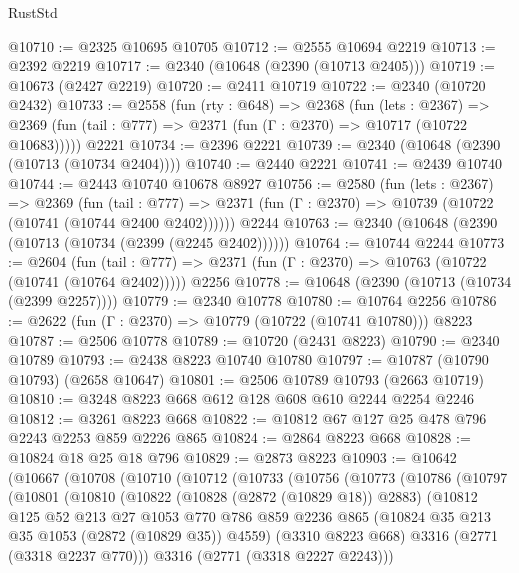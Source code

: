 \begin{lexlean}{RustStd}
\begin{coremodule}
@10710 := @2325 @10695 @10705
@10712 := @2555 @10694 @2219
@10713 := @2392 @2219
@10717 := @2340 (@10648 (@2390 (@10713 @2405)))
@10719 := @10673 (@2427 @2219)
@10720 := @2411 @10719
@10722 := @2340 (@10720 @2432)
@10733 := @2558
    (fun (rty : @648) =>
    @2368
      (fun (lets : @2367) =>
      @2369 (fun (tail : @777) => @2371 (fun (Γ : @2370) => @10717 (@10722 @10683)))))
    @2221
@10734 := @2396 @2221
@10739 := @2340 (@10648 (@2390 (@10713 (@10734 @2404))))
@10740 := @2440 @2221
@10741 := @2439 @10740
@10744 := @2443 @10740 @10678 @8927
@10756 := @2580
    (fun (lets : @2367) =>
    @2369
      (fun (tail : @777) =>
      @2371 (fun (Γ : @2370) => @10739 (@10722 (@10741 (@10744 @2400 @2402))))))
    @2244
@10763 := @2340 (@10648 (@2390 (@10713 (@10734 (@2399 (@2245 @2402))))))
@10764 := @10744 @2244
@10773 := @2604
    (fun (tail : @777) => @2371 (fun (Γ : @2370) => @10763 (@10722 (@10741 (@10764 @2402)))))
    @2256
@10778 := @10648 (@2390 (@10713 (@10734 (@2399 @2257))))
@10779 := @2340 @10778
@10780 := @10764 @2256
@10786 := @2622 (fun (Γ : @2370) => @10779 (@10722 (@10741 @10780))) @8223
@10787 := @2506 @10778
@10789 := @10720 (@2431 @8223)
@10790 := @2340 @10789
@10793 := @2438 @8223 @10740 @10780
@10797 := @10787 (@10790 @10793) (@2658 @10647)
@10801 := @2506 @10789 @10793 (@2663 @10719)
@10810 := @3248 @8223 @668 @612 @128 @608 @610 @2244 @2254 @2246
@10812 := @3261 @8223 @668
@10822 := @10812 @67 @127 @25 @478 @796 @2243 @2253 @859 @2226 @865
@10824 := @2864 @8223 @668
@10828 := @10824 @18 @25 @18 @796
@10829 := @2873 @8223
@10903 := @10642
    (@10667
      (@10708
        (@10710
          (@10712
            (@10733
              (@10756
                (@10773
                  (@10786
                    (@10797
                      (@10801
                        (@10810
                          (@10822
                            (@10828 (@2872 (@10829 @18)) @2883)
                            (@10812
                              @125
                              @52
                              @213
                              @27
                              @1053
                              @770
                              @786
                              @859
                              @2236
                              @865
                              (@10824 @35 @213 @35 @1053 (@2872 (@10829 @35)) @4559)
                              (@3310 @8223 @668)
                              @3316
                              (@2771 (@3318 @2237 @770)))
                            @3316
                            (@2771 (@3318 @2227 @2243)))

\end{coremodule}
\end{lexlean}
